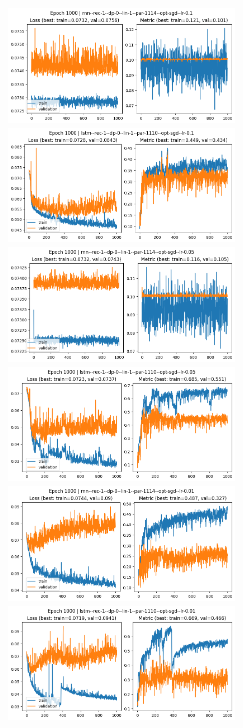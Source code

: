 \documentclass[a4paper,10pt]{article}
\begin{document}
\begin{figure}[H]
      \begin{center}
            \includegraphics[width=6cm]{figures/rnn--rec-1--dp-0--lin-1--par-1114--opt-sgd--lr-0.1--e-1000.png}
            \includegraphics[width=6cm]{figures/lstm--rec-1--dp-0--lin-1--par-1110--opt-sgd--lr-0.1--e-1000.png}
            \includegraphics[width=6cm]{figures/rnn--rec-1--dp-0--lin-1--par-1114--opt-sgd--lr-0.05--e-1000.png}
            \includegraphics[width=6cm]{figures/lstm--rec-1--dp-0--lin-1--par-1110--opt-sgd--lr-0.05--e-1000.png}
            \includegraphics[width=6cm]{figures/rnn--rec-1--dp-0--lin-1--par-1114--opt-sgd--lr-0.01--e-1000.png}
            \includegraphics[width=6cm]{figures/lstm--rec-1--dp-0--lin-1--par-1110--opt-sgd--lr-0.01--e-1000.png}

\end{center}
\end{figure}
\end{document}
